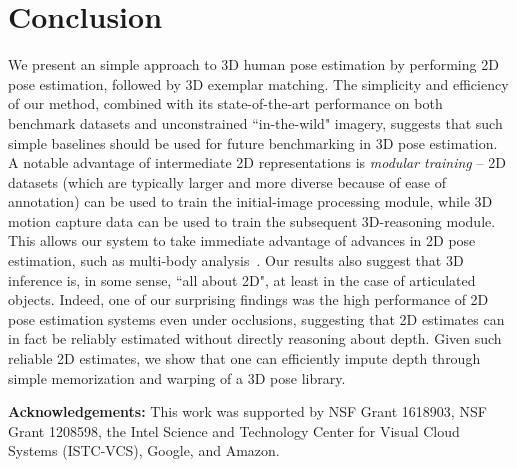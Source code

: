 \documentclass[10pt,twocolumn,letterpaper]{article}
\begin{document}
\begin{table}[t!]
\vspace{5pt}
\caption{We evaluate a Human3.6M-trained model on HumanEva (under Protocol 1).  To isolate the impact of 3D matching, we use ground-truth 2D keypoints. As a point of comparison, average error on Human3.6M test is 70.93 (unwarped) and 57.5 (warped) (Table~\ref{table:gt2d_humaneva}). These results suggest that 3D exemplars do generalize across datasets, and importantly, warping {\em significantly} increases the amount of generalization. Note that the two datasets use different definitions of skeletons, implying that learning a mapping should reduce error even further.}
\label{table:gt2d_humaneva}
\end{table}



\section{Conclusion}
We present an simple approach to 3D human pose estimation by performing 2D pose estimation, followed by 3D exemplar matching. The simplicity and efficiency of our method, combined with its state-of-the-art performance on both benchmark datasets and unconstrained ``in-the-wild" imagery, suggests that such simple baselines should be used for future benchmarking in 3D pose estimation. A notable advantage of intermediate 2D representations is {\em modular training} -- 2D datasets (which are typically larger and more diverse because of ease of annotation) can be used to train the initial-image processing module, while 3D motion capture data can be used to train the subsequent 3D-reasoning module. This allows our system to take immediate advantage of advances in 2D pose estimation, such as multi-body analysis~\cite{eichner2010we}. Our results also suggest that 3D inference is, in some sense, ``all about 2D", at least in the case of articulated objects. Indeed, one of our surprising findings was the high performance of 2D pose estimation systems even under occlusions, suggesting that 2D estimates can in fact be reliably estimated without directly reasoning about depth. Given such reliable 2D estimates, we show that one can efficiently impute depth through simple memorization and warping of a 3D pose library.


{\bf Acknowledgements:} This work was supported by NSF Grant 1618903, NSF Grant 1208598, the Intel Science and Technology Center for Visual Cloud Systems (ISTC-VCS), Google, and Amazon.





\clearpage
{\small


}
\end{document}
